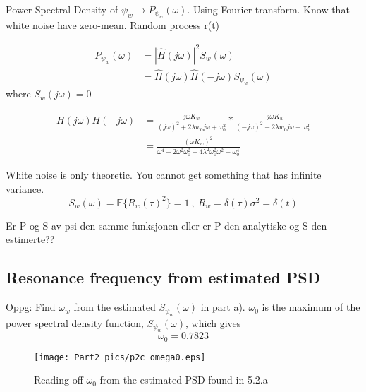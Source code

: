 Power Spectral Density of $\psi_w \rightarrow P_{\psi_w}(\omega)$. Using Fourier transform. Know that white noise have zero-mean. Random process r(t) 

\begin{equation}
\begin{split}
    P_{\psi_w}(\omega) &= |\hat{H}(j\omega)|^2 S_w(\omega) \\
    &= \hat{H}(j\omega) \hat{H}(-j\omega) S_{\psi_w}(\omega)
\end{split}
\end{equation}
where $S_w(j\omega) = 0$ 
\newline

\begin{equation}
\begin{split}
    H(j\omega)H(-j\omega) &= \frac{j\omega K_w}{(j\omega)^2 + 2\lambda w_0 j\omega + \omega_0^2}*\frac{-j \omega K_w}{(-j\omega)^2 - 2\lambda w_0 j\omega + \omega_0^2} \\
    &= \frac{(\omega K_w)^2}{\omega^4 - 2\omega^2 \omega_0^2 + 4 \lambda^2 \omega_0^2 \omega^2 + \omega_0^4}
\end{split}
\end{equation} 

White noise is only theoretic. You cannot get something that has infinite variance. 
\begin{equation*}
    S_w(\omega) = \mathbb{F} \{R_w(\tau)^2\} = 1 \ , \ R_w = \delta(\tau) \sigma^2 = \delta(t)
\end{equation*} 

Er P og S av psi den samme funksjonen eller er P den analytiske og S den estimerte??





\subsection{Resonance frequency from estimated PSD} \label{sec:5.2.c}
Oppg: Find $\omega_w$ from the estimated $S_{\psi_w}(\omega)$ in part a).
\newline
$\omega_0$ is the maximum of the power spectral density function, $S_{\psi_w}(\omega)$, which gives
\begin{equation}
    \omega_0 = 0.7823
\end{equation}

\begin{figure}[H]
    \centering
    \texttt{[image: Part2\_pics/p2c\_omega0.eps]}
    \caption{Reading off $\omega_0$ from the estimated PSD found in 5.2.a}
    \label{fig:p2c}
\end{figure}

